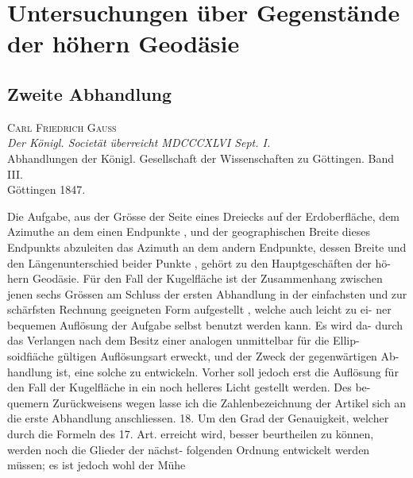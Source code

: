 \documentclass[12pt,a4paper]{article}
\begin{document}
\newpage


\section*{Untersuchungen \"uber Gegenst\"ande der h\"ohern Geod\"asie}
\subsection*{Zweite Abhandlung}

\begin{center}
\textsc{Carl Friedrich Gau\ss{}}\\[0.5em]
\textit{Der K\"onigl. Societ\"at \"uberreicht MDCCCXLVI Sept. I.}\\[0.5em]
Abhandlungen der K\"onigl. Gesellschaft der Wissenschaften zu G\"ottingen. Band III.\\
G\"ottingen 1847.
\end{center}

\bigskip

Die  Aufgabe,  aus  der  Grösse  der  Seite  eines  Dreiecks  auf  der  Erdoberfläche, dem  Azimuthe  an  dem  einen  Endpunkte ,  und  der  geographischen  Breite  dieses Endpunkts  abzuleiten  das  Azimuth  an  dem  andern  Endpunkte,  dessen  Breite  und den  Längenunterschied  beider  Punkte ,  gehört  zu  den  Hauptgeschäften  der  hö- hern Geodäsie.  Für  den  Fall  der  Kugelfläche  ist  der  Zusammenhang  zwischen jenen  sechs  Grössen  am  Schluss  der  ersten  Abhandlung  in  der  einfachsten  und zur  schärfsten  Rechnung  geeigneten  Form  aufgestellt ,  welche  auch  leicht  zu  ei- ner bequemen  Auflösung  der  Aufgabe  selbst  benutzt  werden  kann.  Es  wird  da- durch das  Verlangen  nach  dem  Besitz  einer  analogen  unmittelbar  für  die  Ellip- soidfiäche  gültigen  Auflösungsart  erweckt,  und  der  Zweck  der  gegenwärtigen  Ab- handlung ist,  eine  solche  zu  entwickeln.  Vorher  soll  jedoch  erst  die  Auflösung für  den  Fall  der  Kugelfläche  in  ein  noch  helleres  Licht  gestellt  werden.  Des  be- quemern Zurückweisens  wegen  lasse  ich  die  Zahlenbezeichnung  der  Artikel  sich an  die  erste  Abhandlung  anschliessen. 18. Um  den  Grad  der  Genauigkeit,  welcher  durch  die  Formeln  des  17.  Art. erreicht  wird,  besser  beurtheilen  zu  können,  werden  noch  die  Glieder  der  nächst- folgenden Ordnung  entwickelt  werden  müssen;   es  ist  jedoch  wohl  der  Mühe
\end{document}
